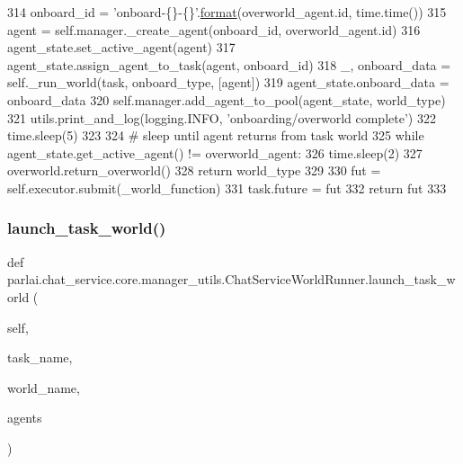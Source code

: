 \begin{DoxyCode}
314                     onboard\_id = \textcolor{stringliteral}{'onboard-\{\}-\{\}'}.\hyperlink{namespaceparlai_1_1chat__service_1_1services_1_1messenger_1_1shared__utils_a32e2e2022b824fbaf80c747160b52a76}{format}(overworld\_agent.id, time.time())
315                     agent = self.manager.\_create\_agent(onboard\_id, overworld\_agent.id)
316                     agent\_state.set\_active\_agent(agent)
317                     agent\_state.assign\_agent\_to\_task(agent, onboard\_id)
318                     \_, onboard\_data = self.\_run\_world(task, onboard\_type, [agent])
319                     agent\_state.onboard\_data = onboard\_data
320                 self.manager.add\_agent\_to\_pool(agent\_state, world\_type)
321                 utils.print\_and\_log(logging.INFO, \textcolor{stringliteral}{'onboarding/overworld complete'})
322                 time.sleep(5)
323 
324                 \textcolor{comment}{# sleep until agent returns from task world}
325                 \textcolor{keywordflow}{while} agent\_state.get\_active\_agent() != overworld\_agent:
326                     time.sleep(2)
327                 overworld.return\_overworld()
328             \textcolor{keywordflow}{return} world\_type
329 
330         fut = self.executor.submit(\_world\_function)
331         task.future = fut
332         \textcolor{keywordflow}{return} fut
333 \end{DoxyCode}
\mbox{\label{classparlai_1_1chat__service_1_1core_1_1manager__utils_1_1ChatServiceWorldRunner_ac6b8bd46cafa3ce7a5a74f4c1c35b8a8}} 
\subsubsection{\texorpdfstring{launch\+\_\+task\+\_\+world()}{launch\_task\_world()}}
{\footnotesize\ttfamily def parlai.\+chat\+\_\+service.\+core.\+manager\+\_\+utils.\+Chat\+Service\+World\+Runner.\+launch\+\_\+task\+\_\+world (\begin{DoxyParamCaption}\item[{}]{self,  }\item[{}]{task\+\_\+name,  }\item[{}]{world\+\_\+name,  }\item[{}]{agents }\end{DoxyParamCaption})}

